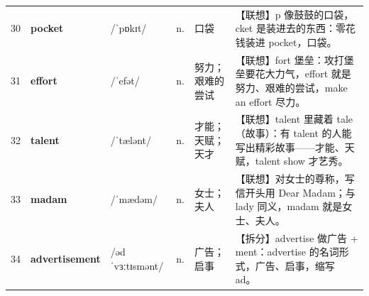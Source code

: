 \documentclass[UTF8,a4paper,11pt,oneside]{ctexbook}
\newcommand{\cellword}[1]{{\bfseries\textcolor{wordcol}{#1}}}
\newcommand{\cellipa}[1]{{\footnotesize\textcolor{ipacol}{#1}}}
\newcommand{\cellpos}[1]{\textcolor{poscol}{#1}}
\newcommand{\cellno}[1]{\textcolor{volcolor!75!black}{#1}}
\begin{document}
{\begin{longtable}{@{}C{0.045\textwidth}L{0.155\textwidth}L{0.175\textwidth}C{0.070\textwidth}L{0.180\textwidth}L{0.282\textwidth}@{}}
\cellno{30} & \cellword{pocket} & \cellipa{/ˈpɒkɪt/} & \cellpos{n.} & 口袋 & \textcolor{tagAssoc}{【联想】}p 像鼓鼓的口袋，cket 是装进去的东西：零花钱装进 pocket，口袋。 \\
 \cellno{31} & \cellword{effort} & \cellipa{/ˈefət/} & \cellpos{n.} & 努力；艰难的尝试 & \textcolor{tagAssoc}{【联想】}fort 堡垒：攻打堡垒要花大力气，effort 就是努力、艰难的尝试，make an effort 尽力。 \\
\cellno{32} & \cellword{talent} & \cellipa{/ˈtælənt/} & \cellpos{n.} & 才能；天赋；天才 & \textcolor{tagAssoc}{【联想】}talent 里藏着 tale（故事）：有 talent 的人能写出精彩故事——才能、天赋，talent show 才艺秀。 \\
 \cellno{33} & \cellword{madam} & \cellipa{/ˈmædəm/} & \cellpos{n.} & 女士；夫人 & \textcolor{tagAssoc}{【联想】}对女士的尊称，写信开头用 Dear Madam；与 lady 同义，madam 就是女士、夫人。 \\
\cellno{34} & \cellword{advertisement} & \cellipa{/ədˈvɜːtɪsmənt/} & \cellpos{n.} & 广告；启事 & \textcolor{tagSplit}{【拆分】}advertise 做广告 + ment：advertise 的名词形式，广告、启事，缩写 ad。 \\
\end{longtable}
}

\end{document}
